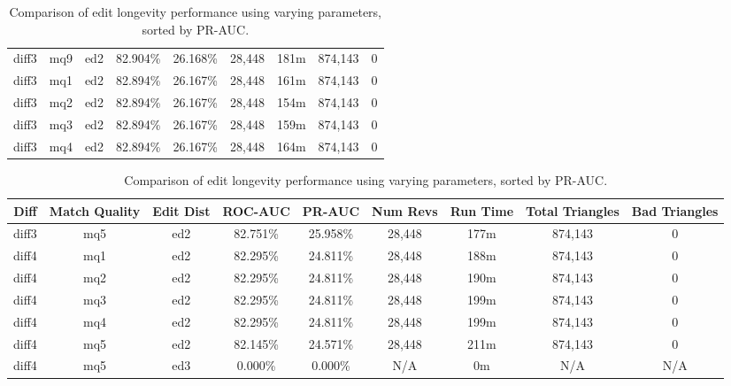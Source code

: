 \begin{sidewaystable}[!tp]
\begin{center}
\begin{tabular}{|c|c|c||c|c||c|c|c|c|}
diff3 & mq9 & ed2 & 82.904\% & 26.168\% & 28,448 & 181m & 874,143 & 0 \\
diff3 & mq1 & ed2 & 82.894\% & 26.167\% & 28,448 & 161m & 874,143 & 0 \\
diff3 & mq2 & ed2 & 82.894\% & 26.167\% & 28,448 & 154m & 874,143 & 0 \\
diff3 & mq3 & ed2 & 82.894\% & 26.167\% & 28,448 & 159m & 874,143 & 0 \\
diff3 & mq4 & ed2 & 82.894\% & 26.167\% & 28,448 & 164m & 874,143 & 0 \\
\hline
\end{tabular}
\end{center}
\caption{Comparison of edit longevity performance using
    varying parameters, sorted by PR-AUC.}
\label{tab:editshout}
\end{sidewaystable}
\begin{sidewaystable}[!tp]
  \begin{center}
    \begin{tabular}{|c|c|c||c|c||c|c|c|c|}
\hline
Diff & Match Quality & Edit Dist
        & ROC-AUC & PR-AUC
        & Num Revs & Run Time
        & Total Triangles & Bad Triangles \\
\hline
\hline
diff3 & mq5 & ed2 & 82.751\% & 25.958\% & 28,448 & 177m & 874,143 & 0 \\
diff4 & mq1 & ed2 & 82.295\% & 24.811\% & 28,448 & 188m & 874,143 & 0 \\
diff4 & mq2 & ed2 & 82.295\% & 24.811\% & 28,448 & 190m & 874,143 & 0 \\
diff4 & mq3 & ed2 & 82.295\% & 24.811\% & 28,448 & 199m & 874,143 & 0 \\
diff4 & mq4 & ed2 & 82.295\% & 24.811\% & 28,448 & 199m & 874,143 & 0 \\
diff4 & mq5 & ed2 & 82.145\% & 24.571\% & 28,448 & 211m & 874,143 & 0 \\
diff4 & mq5 & ed3 & 0.000\% & 0.000\% & N/A & 0m & N/A & N/A \\
\hline
\end{tabular}
\end{center}
\caption{Comparison of edit longevity performance using
    varying parameters, sorted by PR-AUC.}
\label{tab:editshout}
\end{sidewaystable}
